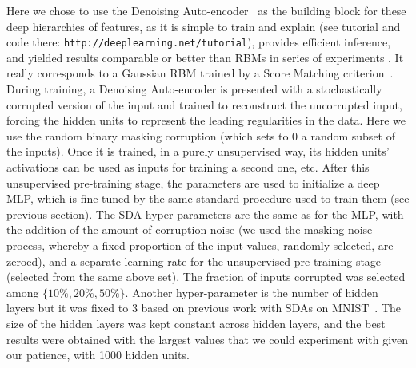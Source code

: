 \documentclass{article} %
\begin{document}
Here we chose to use the Denoising
Auto-encoder~\citep{VincentPLarochelleH2008-very-small} as the building block for
these deep hierarchies of features, as it is simple to train and
explain (see %
tutorial and code there: {\tt http://deeplearning.net/tutorial}), 
provides efficient inference, and yielded results
comparable or better than RBMs in series of experiments
\citep{VincentPLarochelleH2008-very-small}. It really corresponds to a Gaussian
RBM trained by a Score Matching criterion~\cite{Vincent-SM-2010}.
During training, a Denoising
Auto-encoder is presented with a stochastically corrupted version
of the input and trained to reconstruct the uncorrupted input,
forcing the hidden units to represent the leading regularities in
the data. Here we use the random binary masking corruption
(which sets to 0 a random subset of the inputs).
 Once it is trained, in a purely unsupervised way, 
its hidden units' activations can
be used as inputs for training a second one, etc.
After this unsupervised pre-training stage, the parameters
are used to initialize a deep MLP, which is fine-tuned by
the same standard procedure used to train them (see previous section).
The SDA hyper-parameters are the same as for the MLP, with the addition of the
amount of corruption noise (we used the masking noise process, whereby a
fixed proportion of the input values, randomly selected, are zeroed), and a
separate learning rate for the unsupervised pre-training stage (selected
from the same above set). The fraction of inputs corrupted was selected
among $\{10\%, 20\%, 50\%\}$. Another hyper-parameter is the number
of hidden layers but it was fixed to 3 based on previous work with
SDAs on MNIST~\citep{VincentPLarochelleH2008-very-small}. The size of the hidden
layers was kept constant across hidden layers, and the best results
were obtained with the largest values that we could experiment
with given our patience, with 1000 hidden units.

\vspace*{-1mm}
\end{document}
